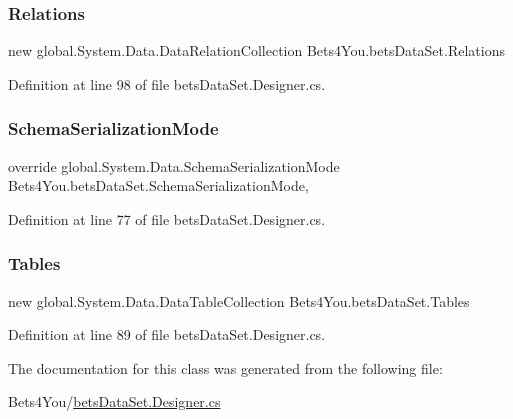 \subsubsection{\texorpdfstring{Relations}{Relations}}
{\footnotesize\ttfamily new global.\+System.\+Data.\+Data\+Relation\+Collection Bets4\+You.\+bets\+Data\+Set.\+Relations\hspace{0.3cm}{\ttfamily [get]}}



Definition at line 98 of file bets\+Data\+Set.\+Designer.\+cs.

\mbox{\label{class_bets4_you_1_1bets_data_set_ad7c4bcb777e168bfe49a2ce4ab164f8b}} 
\subsubsection{\texorpdfstring{SchemaSerializationMode}{SchemaSerializationMode}}
{\footnotesize\ttfamily override global.\+System.\+Data.\+Schema\+Serialization\+Mode Bets4\+You.\+bets\+Data\+Set.\+Schema\+Serialization\+Mode\hspace{0.3cm}{\ttfamily [get]}, {\ttfamily [set]}}



Definition at line 77 of file bets\+Data\+Set.\+Designer.\+cs.

\mbox{\label{class_bets4_you_1_1bets_data_set_a84665f17591ef8d70a383f9a2576ae77}} 
\subsubsection{\texorpdfstring{Tables}{Tables}}
{\footnotesize\ttfamily new global.\+System.\+Data.\+Data\+Table\+Collection Bets4\+You.\+bets\+Data\+Set.\+Tables\hspace{0.3cm}{\ttfamily [get]}}



Definition at line 89 of file bets\+Data\+Set.\+Designer.\+cs.



The documentation for this class was generated from the following file\+:\begin{DoxyCompactItemize}
\item 
Bets4\+You/\mbox{\hyperlink{bets_data_set_8_designer_8cs}{bets\+Data\+Set.\+Designer.\+cs}}\end{DoxyCompactItemize}
